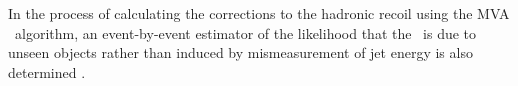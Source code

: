 In the process of calculating the corrections to the hadronic recoil using the MVA \MET~algorithm, an event-by-event
estimator of the likelihood that the \MET~is due to unseen objects rather than induced
by mismeasurement of jet energy is also determined \cite{cms-met-run1}.

